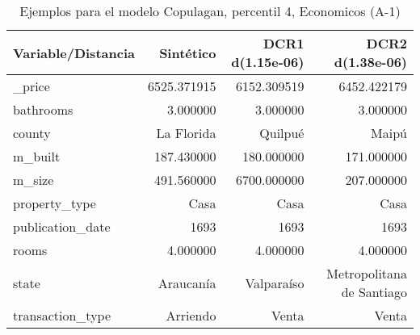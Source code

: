 \begin{table}[H]
\centering
\fontsize{10}{14}\selectfont
\caption{Ejemplos para el modelo Copulagan, percentil 4, Economicos (A-1)}
\label{table-example-economicos-a-1-copulagan-4p}
\begin{tabular}{|l|r|r|r|}
\hline
\rowcolor[gray]{0.8}
Variable/Distancia & Sintético & DCR1 d(1.15e-06) & DCR2 d(1.38e-06) \\
\hline \_price & \cellcolor[rgb]{0.9, 0.54, 0.52} 6525.371915 & 6152.309519 & 6452.422179 \\
\hline bathrooms & \cellcolor[rgb]{0.9, 0.54, 0.52} 3.000000 & \cellcolor[rgb]{0.9, 0.54, 0.52} 3.000000 & \cellcolor[rgb]{0.9, 0.54, 0.52} 3.000000 \\
\hline county & \cellcolor[rgb]{0.9, 0.54, 0.52} La Florida & Quilpué & Maipú \\
\hline m\_built & \cellcolor[rgb]{0.9, 0.54, 0.52} 187.430000 & 180.000000 & 171.000000 \\
\hline m\_size & \cellcolor[rgb]{0.9, 0.54, 0.52} 491.560000 & 6700.000000 & 207.000000 \\
\hline property\_type & \cellcolor[rgb]{0.9, 0.54, 0.52} Casa & \cellcolor[rgb]{0.9, 0.54, 0.52} Casa & \cellcolor[rgb]{0.9, 0.54, 0.52} Casa \\
\hline publication\_date & \cellcolor[rgb]{0.9, 0.54, 0.52} 1693 & \cellcolor[rgb]{0.9, 0.54, 0.52} 1693 & \cellcolor[rgb]{0.9, 0.54, 0.52} 1693 \\
\hline rooms & \cellcolor[rgb]{0.9, 0.54, 0.52} 4.000000 & \cellcolor[rgb]{0.9, 0.54, 0.52} 4.000000 & \cellcolor[rgb]{0.9, 0.54, 0.52} 4.000000 \\
\hline state & \cellcolor[rgb]{0.9, 0.54, 0.52} Araucanía & Valparaíso & Metropolitana de Santiago \\
\hline transaction\_type & \cellcolor[rgb]{0.9, 0.54, 0.52} Arriendo & Venta & Venta \\
\hline
\end{tabular}
\end{table}

